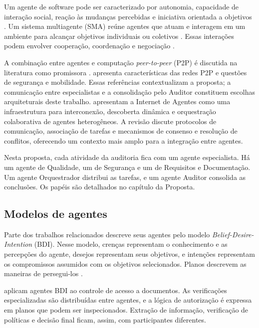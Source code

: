Um agente de software pode ser caracterizado por autonomia, capacidade de interação social, reação às mudanças percebidas e iniciativa orientada a objetivos \cite{wooldridge1995}. Um sistema multiagente (SMA) reúne agentes que atuam e interagem em um ambiente para alcançar objetivos individuais ou coletivos \cite{wooldridge2009,lazarin2025}. Essas interações podem envolver cooperação, coordenação e negociação \cite{wooldridge2009}.

A combinação entre agentes e computação \textit{peer-to-peer} (P2P) é discutida na literatura como promissora \cite{moro2003}.  apresenta características das redes P2P e questões de segurança e mobilidade. Essas referências contextualizam a proposta; a comunicação entre especialistas e a consolidação pelo Auditor constituem escolhas arquiteturais deste trabalho.
 apresentam a Internet de Agentes como uma infraestrutura para interconexão, descoberta dinâmica e orquestração colaborativa de agentes heterogêneos. A revisão discute protocolos de comunicação, associação de tarefas e mecanismos de consenso e resolução de conflitos, oferecendo um contexto mais amplo para a integração entre agentes.

Nesta proposta, cada atividade da auditoria fica com um agente especialista. Há um agente de Qualidade, um de Segurança e um de Requisitos e Documentação. Um agente Orquestrador distribui as tarefas, e um agente Auditor consolida as conclusões. Os papéis são detalhados no capítulo da Proposta.

\subsection{Modelos de agentes}
\label{rt-2-3-2}

Parte dos trabalhos relacionados descreve seus agentes pelo modelo \textit{Belief-Desire-Intention} (BDI). Nesse modelo, crenças representam o conhecimento e as percepções do agente, desejos representam seus objetivos, e intenções representam os compromissos assumidos com os objetivos selecionados. Planos descrevem as maneiras de persegui-los \cite{raoGeorgeff1995,lazarin2025}.

 aplicam agentes BDI ao controle de acesso a documentos. As verificações especializadas são distribuídas entre agentes, e a lógica de autorização é expressa em planos que podem ser inspecionados. Extração de informação, verificação de políticas e decisão final ficam, assim, com participantes diferentes.

